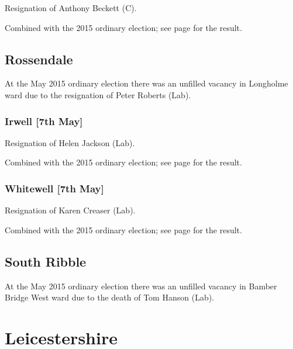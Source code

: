 \documentclass[a4paper,openany]{book}
\begin{document}
\begin{resultsiii}

Resignation of Anthony Beckett (C).

Combined with the 2015 ordinary election; see page \pageref{BarrowfordPendle} for the result.

\subsection*{Rossendale}

At the May 2015 ordinary election there was an unfilled vacancy in Longholme ward due to the resignation of Peter Roberts (Lab).

\subsubsection*{Irwell \hspace*{\fill}\nolinebreak[1]%
\enspace\hspace*{\fill}
[7th May]}


Resignation of Helen Jackson (Lab).

Combined with the 2015 ordinary election; see page \pageref{IrwellRossendale} for the result.

\subsubsection*{Whitewell \hspace*{\fill}\nolinebreak[1]%
\enspace\hspace*{\fill}
[7th May]}


Resignation of Karen Creaser (Lab).

Combined with the 2015 ordinary election; see page \pageref{WhitewellRossendale} for the result.

\subsection*{South Ribble}

At the May 2015 ordinary election there was an unfilled vacancy in Bamber Bridge West ward due to the death of Tom Hanson (Lab).

\section{Leicestershire}


\end{resultsiii}
\end{document}

